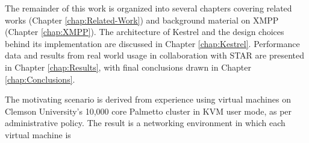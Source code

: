 The remainder of this work is organized into several chapters covering related
works (Chapter \ref{chap:Related-Work}) and background material on XMPP (Chapter
\ref{chap:XMPP}). The architecture of Kestrel and the design choices behind
its implementation are discussed in Chapter \ref{chap:Kestrel}. Performance
data and results from real world usage in collaboration with STAR are presented
in Chapter \ref{chap:Results}, with final conclusions drawn in Chapter
\ref{chap:Conclusions}.

The motivating scenario is derived from experience
using virtual machines on Clemson University's 10,000 core Palmetto cluster in
KVM user mode, as per administrative policy. The result is a networking environment
in which each virtual machine is 



